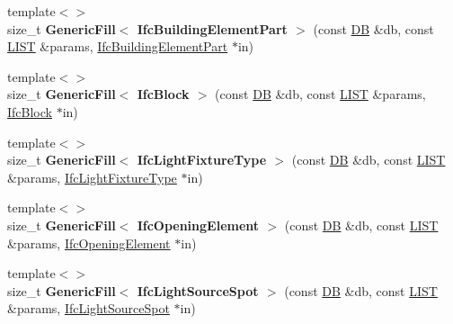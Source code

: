 \begin{DoxyCompactItemize}
\item 
\hypertarget{namespace_assimp_1_1_s_t_e_p_a57cf6ba70c42ba7f42a3827b0af99354}{{\footnotesize template$<$$>$ }\\size\+\_\+t {\bfseries Generic\+Fill$<$ Ifc\+Building\+Element\+Part $>$} (const \hyperlink{class_assimp_1_1_s_t_e_p_1_1_d_b}{D\+B} \&db, const \hyperlink{class_assimp_1_1_s_t_e_p_1_1_e_x_p_r_e_s_s_1_1_l_i_s_t}{L\+I\+S\+T} \&params, \hyperlink{struct_assimp_1_1_i_f_c_1_1_ifc_building_element_part}{Ifc\+Building\+Element\+Part} $\ast$in)}\label{namespace_assimp_1_1_s_t_e_p_a57cf6ba70c42ba7f42a3827b0af99354}

\item 
\hypertarget{namespace_assimp_1_1_s_t_e_p_a653824695754d8775109123831e5fa1e}{{\footnotesize template$<$$>$ }\\size\+\_\+t {\bfseries Generic\+Fill$<$ Ifc\+Block $>$} (const \hyperlink{class_assimp_1_1_s_t_e_p_1_1_d_b}{D\+B} \&db, const \hyperlink{class_assimp_1_1_s_t_e_p_1_1_e_x_p_r_e_s_s_1_1_l_i_s_t}{L\+I\+S\+T} \&params, \hyperlink{struct_assimp_1_1_i_f_c_1_1_ifc_block}{Ifc\+Block} $\ast$in)}\label{namespace_assimp_1_1_s_t_e_p_a653824695754d8775109123831e5fa1e}

\item 
\hypertarget{namespace_assimp_1_1_s_t_e_p_a6ee1a67725692c72f196a8d895203544}{{\footnotesize template$<$$>$ }\\size\+\_\+t {\bfseries Generic\+Fill$<$ Ifc\+Light\+Fixture\+Type $>$} (const \hyperlink{class_assimp_1_1_s_t_e_p_1_1_d_b}{D\+B} \&db, const \hyperlink{class_assimp_1_1_s_t_e_p_1_1_e_x_p_r_e_s_s_1_1_l_i_s_t}{L\+I\+S\+T} \&params, \hyperlink{struct_assimp_1_1_i_f_c_1_1_ifc_light_fixture_type}{Ifc\+Light\+Fixture\+Type} $\ast$in)}\label{namespace_assimp_1_1_s_t_e_p_a6ee1a67725692c72f196a8d895203544}

\item 
\hypertarget{namespace_assimp_1_1_s_t_e_p_aeb887b7599060357e34722b4b03bf0dc}{{\footnotesize template$<$$>$ }\\size\+\_\+t {\bfseries Generic\+Fill$<$ Ifc\+Opening\+Element $>$} (const \hyperlink{class_assimp_1_1_s_t_e_p_1_1_d_b}{D\+B} \&db, const \hyperlink{class_assimp_1_1_s_t_e_p_1_1_e_x_p_r_e_s_s_1_1_l_i_s_t}{L\+I\+S\+T} \&params, \hyperlink{struct_assimp_1_1_i_f_c_1_1_ifc_opening_element}{Ifc\+Opening\+Element} $\ast$in)}\label{namespace_assimp_1_1_s_t_e_p_aeb887b7599060357e34722b4b03bf0dc}

\item 
\hypertarget{namespace_assimp_1_1_s_t_e_p_ab0784f11f4d65e0c61b5fa2b8f8ba9b1}{{\footnotesize template$<$$>$ }\\size\+\_\+t {\bfseries Generic\+Fill$<$ Ifc\+Light\+Source\+Spot $>$} (const \hyperlink{class_assimp_1_1_s_t_e_p_1_1_d_b}{D\+B} \&db, const \hyperlink{class_assimp_1_1_s_t_e_p_1_1_e_x_p_r_e_s_s_1_1_l_i_s_t}{L\+I\+S\+T} \&params, \hyperlink{struct_assimp_1_1_i_f_c_1_1_ifc_light_source_spot}{Ifc\+Light\+Source\+Spot} $\ast$in)}\label{namespace_assimp_1_1_s_t_e_p_ab0784f11f4d65e0c61b5fa2b8f8ba9b1}


\end{DoxyCompactItemize}
